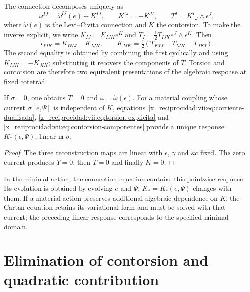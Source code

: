 \begin{HMTCompactSection}
The connection decomposes uniquely as
\begin{equation}
 \omega^{IJ}=\mathring\omega^{IJ}(e)+K^{IJ},\qquad
 K^{IJ}=-K^{JI},\qquad T^I=K^I{}_{J}\wedge e^J,
 \label{x_reciprocidad:vii:eq:contorsion}
\end{equation}
where \(\mathring\omega(e)\) is the Levi--Civita connection and \(K\) the contorsion. To make the inverse explicit, we write \(K_{IJ}=K_{IJK}e^K\) and \(T_I=\tfrac12T_{IJK}e^J\wedge e^K\). Then
\begin{equation}
 T_{IJK}=K_{IKJ}-K_{IJK},\qquad
 K_{IJK}=\tfrac12(T_{KIJ}-T_{IJK}-T_{JKI}).
 \label{x_reciprocidad:vii:eq:contorsion-componentes}
\end{equation}
The second equality is obtained by combining the first cyclically and using \(K_{IJK}=-K_{JIK}\); substituting it recovers the components of \(T\). Torsion and contorsion are therefore two equivalent presentations of the algebraic response at fixed cotetrad.

\begin{corollary}
\label{x_reciprocidad:vii:cor:desacoplamiento-torsional}
If \(\sigma=0\), one obtains \(T=0\) and \(\omega=\mathring\omega(e)\). For a material coupling whose current \(\sigma[e,\Psi]\) is independent of \(K\), equations~\eqref{x_reciprocidad:vii:eq:corriente-dualizada}, \eqref{x_reciprocidad:vii:eq:torsion-explicita} and \eqref{x_reciprocidad:vii:eq:contorsion-componentes} provide a unique response \(K_*(e,\Psi)\), linear in \(\sigma\).
\end{corollary}
\begin{proof}
The three reconstruction maps are linear with \(e\), \(\gamma\) and \(\kappa c\) fixed. The zero current produces \(Y=0\), then \(T=0\) and finally \(K=0\).
\end{proof}

In the minimal action, the connection equation contains this pointwise response. Its evolution is obtained by evolving \(e\) and \(\Psi\): \(K_*=K_*(e,\Psi)\) changes with them. If a material action preserves additional algebraic dependence on \(K\), the Cartan equation retains its variational form and must be solved with that current; the preceding linear response corresponds to the specified minimal domain.

\section{Elimination of contorsion and quadratic contribution}
\label{x_reciprocidad:vii:subsec:respuesta-cuadratica}


\end{HMTCompactSection}
